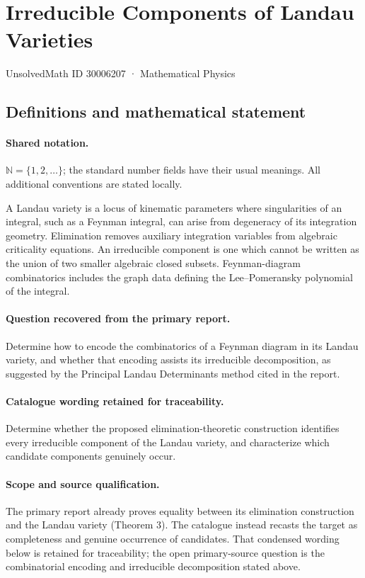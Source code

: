 \documentclass[11pt]{article}
\begin{document}
\setcounter{section}{30006206}
\section{Irreducible Components of Landau Varieties}\label{30006207}
{\small UnsolvedMath ID 30006207 · Mathematical Physics}
\subsection{Definitions and mathematical statement}

\paragraph{Shared notation.}$\mathbb N=\{1,2,\ldots\}$; the standard number fields have their usual meanings. All additional conventions are stated locally.


A Landau variety is a locus of kinematic parameters where singularities of an integral, such as a Feynman integral, can arise from degeneracy of its integration geometry. Elimination removes auxiliary integration variables from algebraic criticality equations. An irreducible component is one which cannot be written as the union of two smaller algebraic closed subsets. Feynman-diagram combinatorics includes the graph data defining the Lee--Pomeransky polynomial of the integral.

\paragraph{Question recovered from the primary report.}Determine how to encode the combinatorics of a Feynman diagram in its Landau variety, and whether that encoding assists its irreducible decomposition, as suggested by the Principal Landau Determinants method cited in the report.

\paragraph{Catalogue wording retained for traceability.}
Determine whether the proposed elimination-theoretic construction identifies every irreducible component of the Landau variety, and characterize which candidate components genuinely occur.

\paragraph{Scope and source qualification.}The primary report already proves equality between its elimination construction and the Landau variety (Theorem 3). The catalogue instead recasts the target as completeness and genuine occurrence of candidates. That condensed wording below is retained for traceability; the open primary-source question is the combinatorial encoding and irreducible decomposition stated above.
\end{document}
